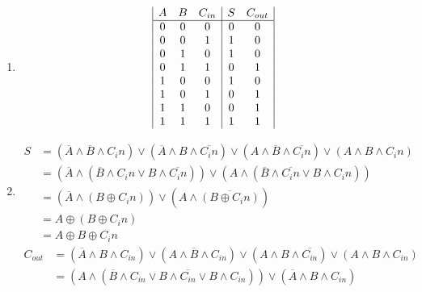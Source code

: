 \documentclass{article}
\begin{document}
    \begin{enumerate}[label={\alph*)}]
        \item \begin{displaymath}
            \begin{array}{|c c c | c c|}
                A & B & C_{in} & S & C_{out} \\
                \hline
                0 & 0 & 0 & 0 & 0 \\
                0 & 0 & 1 & 1 & 0 \\
                0 & 1 & 0 & 1 & 0 \\
                0 & 1 & 1 & 0 & 1 \\
                1 & 0 & 0 & 1 & 0 \\
                1 & 0 & 1 & 0 & 1 \\
                1 & 1 & 0 & 0 & 1 \\
                1 & 1 & 1 & 1 & 1 \\
            \end{array}
        \end{displaymath}
        \item \begin{displaymath}
            \begin{aligned}
                S
                &= (\overline{A} \land \overline{B} \land C_in) \lor (\overline{A} \land B \land \overline{C_in}) \lor (A \land \overline{B} \land \overline{C_in}) \lor (A \land B \land C_in) \\ 
                &= (\overline{A} \land (\overline{B} \land C_in \lor B \land \overline{C_in})) \lor (A \land (\overline{B} \land \overline{C_in} \lor B \land C_in)) \\
                &= (\overline{A} \land (B \oplus C_in)) \lor (A \land \overline{(B \oplus C_in)}) \\
                &= A \oplus (B \oplus C_in) \\
                &= A \oplus B \oplus C_in
            \end{aligned}
        \end{displaymath}
        \begin{displaymath}
            \begin{aligned}
                C_{out} 
                &= (\overline{A} \land B \land C_{in}) \lor (A \land \overline{B} \land C_{in}) \lor (A \land B \land \overline{C_{in}}) \lor (A \land B \land C_{in}) \\ 
                &= (A \land (\overline{B} \land C_{in} \lor B \land \overline{C_{in}} \lor B \land C_{in})) \lor (\overline{A} \land B \land C_{in}) \\

\end{aligned}
\end{displaymath}
\end{enumerate}
\end{document}
